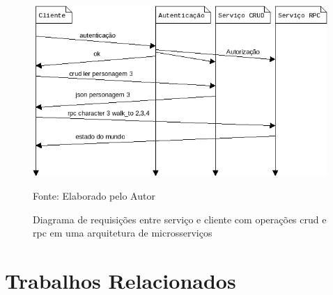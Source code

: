 \begin{figure}[htb!]
\caption{Diagrama de requisições entre serviço e cliente com operações \ac{crud} e \ac{rpc} em uma arquitetura de microsserviços}
\label{fig:network_crud_rpc_micro}
\includegraphics[height=6.5cm]{img/cap2/network_rpc_crud_micro.png}
\centering

Fonte: Elaborado pelo Autor
\end{figure}



\section{Trabalhos Relacionados}
\label{sec:similares}

